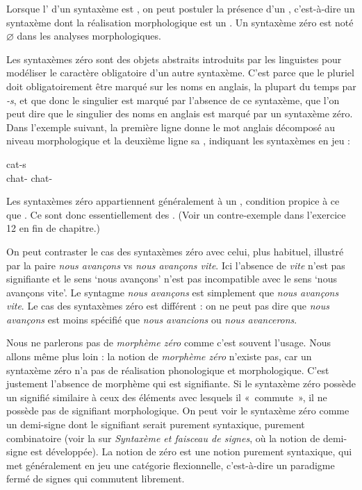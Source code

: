 {Lorsque l’ d’un syntaxème est , on peut postuler la présence d’un , c’est-à-dire un syntaxème dont la réalisation morphologique est un . Un syntaxème zéro est noté ${\varnothing}$ dans les analyses morphologiques.}

Les syntaxèmes zéro sont des objets abstraits introduits par les linguistes pour modéliser le caractère obligatoire d’un autre syntaxème. C’est parce que le pluriel doit obligatoirement être marqué sur les noms en anglais, la plupart du temps par \textit{{}-s}, et que donc le singulier est marqué par l’absence de ce syntaxème, que l’on peut dire que le singulier des noms en anglais est marqué par un syntaxème zéro. Dans l’exemple suivant, la première ligne donne le mot anglais décomposé au niveau morphologique et la deuxième ligne sa , indiquant les syntaxèmes en jeu :

\ea
{}  \hspace{1em}  {cat-s}\\
      {chat-\SG}  {}  {chat-\PL}\\
\z

Les syntaxèmes zéro appartiennent généralement à un , condition propice à ce que  . Ce sont donc essentiellement des . (Voir un contre-exemple dans l'exercice 12 en fin de chapitre.)

On peut contraster le cas des syntaxèmes zéro avec celui, plus habituel, illustré par la paire \textit{nous avançons} vs \textit{nous avançons vite}. Ici l’absence de \textit{vite} n’est pas signifiante et le sens ‘nous avançons’ n’est pas incompatible avec le sens ‘nous avançons vite’. Le syntagme \textit{nous avançons} est simplement  que \textit{nous avançons vite}. Le cas des syntaxèmes zéro est différent : on ne peut pas dire que \textit{nous avançons} est moins spécifié que \textit{nous avancions} ou \textit{nous avancerons}.

Nous ne parlerons pas de \textit{morphème zéro} comme c’est souvent l’usage. Nous allons même plus loin : la notion de \textit{morphème zéro} n’existe pas, car un syntaxème zéro n’a pas de réalisation phonologique et morphologique. C’est justement l’absence de morphème qui est signifiante. Si le syntaxème zéro possède un signifié similaire à ceux des éléments avec lesquels il «~commute~», il ne possède pas de signifiant morphologique. On peut voir le syntaxème zéro comme un demi-signe dont le signifiant serait purement syntaxique, purement combinatoire (voir la  sur \textit{Syntaxème et faisceau de signes}, où la notion de demi-signe est développée). La notion de zéro est une notion purement syntaxique, qui met généralement en jeu une catégorie flexionnelle, c’est-à-dire un paradigme fermé de signes qui commutent librement.

